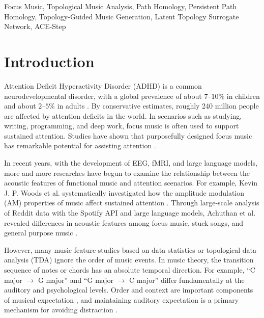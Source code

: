 \documentclass{article}
\begin{document}
\begin{keywords}
  Focus Music, Topological Music Analysis, Path Homology, Persistent Path Homology, Topology-Guided Music Generation, Latent Topology Surrogate Network, ACE-Step
\end{keywords}

\clearpage

\setcounter{tocdepth}{2}
\tableofcontents

\clearpage

\section{Introduction}

Attention Deficit Hyperactivity Disorder (ADHD) is a common neurodevelopmental disorder, with a global prevalence of about $7$--$10\%$ in children and about $2$--$5\%$ in adults \cite{Siva2025}. By conservative estimates, roughly 240 million people are affected by attention deficits in the world. In scenarios such as studying, writing, programming, and deep work, focus music is often used to support sustained attention. Studies have shown that purposefully designed focus music has remarkable potential for assisting attention \cite{MADJAR2020113207, Phoebe2025, Erarslan2026}.

In recent years, with the development of EEG, fMRI, and large language models, more and more researches have begun to examine the relationship between the acoustic features of functional music and attention scenarios. For example, Kevin J. P. Woods et al. systematically investigated how the amplitude modulation (AM) properties of music affect sustained attention \cite{Woods2024}. Through large-scale analysis of Reddit data with the Spotify API and large language models, Achuthan et al. revealed differences in acoustic features among focus music, stuck songs, and general purpose music \cite{Achuthan2025}.

However, many music feature studies based on data statistics or topological data analysis (TDA) ignore the order of music events. In music theory, the transition sequence of notes or chords has an absolute temporal direction. For example, ``C major $\to$ G major'' and ``G major $\to$ C major'' differ fundamentally at the auditory and psychological levels. Order and context are important components of musical expectation \cite{Stefan2000, David2001}, and maintaining auditory expectation is a primary mechanism for avoiding distraction \cite{Fiedlere2066232025}.
\end{document}
